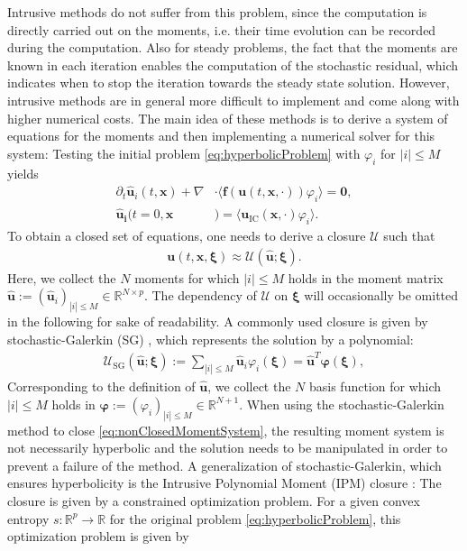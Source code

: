 Intrusive methods do not suffer from this problem, since the computation is directly carried out on the moments, i.e. their time evolution can be recorded during the computation. Also for steady problems, the fact that the moments are known in each iteration enables the computation of the stochastic residual, which indicates when to stop the iteration towards the steady state solution. However, intrusive methods are in general more difficult to implement and come along with higher numerical costs. The main idea of these methods is to derive a system of equations for the moments and then implementing a numerical solver for this system: Testing the initial problem \eqref{eq:hyperbolicProblem} with $\varphi_i$ for $|i|\leq M$ yields
\begin{subequations}\label{eq:nonClosedMomentSystem}
\begin{align}
\partial_t \bm{\hat u}_i(t,\bm{x}) + \nabla&\cdot\langle\bm{f}(\bm{u}(t,\bm{x},\cdot)) \varphi_i\rangle = \bm{0}, \\
\bm{\hat u_i}(t=0,\bm{x}&) = \langle\bm{u}_{\text{IC}}(\bm{x},\cdot)\varphi_i\rangle.
\end{align}
\end{subequations}
To obtain a closed set of equations, one needs to derive a closure $\mathcal{U}$ such that 
\begin{align*}
\bm{u}(t,\bm x,\bm \xi) \approx \mathcal{U}(\bm{\hat u};\bm\xi).
\end{align*}
Here, we collect the $N$ moments for which $\vert i \vert \leq M$ holds in the moment matrix $\bm{\hat{u}}:=(\bm{\hat{u}}_i)_{|i|\leq M}\in\mathbb{R}^{N \times p}$. The dependency of $\mathcal{U}$ on $\bm \xi$ will occasionally be omitted in the following for sake of readability. A commonly used closure is given by stochastic-Galerkin (SG) \cite{ghanem2003stochastic}, which represents the solution by a polynomial:
\begin{align}\label{eq:SGClosure}
\mathcal{U}_{\text{SG}}(\bm{\hat u};\bm\xi):= \sum_{|i|\leq M} \bm{\hat{u}}_i\varphi_i(\bm{\xi}) = \hat{\bm u}^T\bm{\varphi}(\bm\xi),
\end{align}
Corresponding to the definition of $\bm{\hat u}$, we collect the $N$ basis function for which $\vert i \vert \leq M$ holds in $\bm{\varphi}:=(\varphi_i)_{|i|\leq M}\in\mathbb{R}^{N+1}$. When using the stochastic-Galerkin method to close \eqref{eq:nonClosedMomentSystem}, the resulting moment system is not necessarily hyperbolic \cite{poette2009uncertainty} and the solution needs to be manipulated \cite{schlachter2018hyperbolicity} in order to prevent a failure of the method. A generalization of stochastic-Galerkin, which ensures hyperbolicity is the Intrusive Polynomial Moment (IPM) closure \cite{poette2009uncertainty}: The closure is given by a constrained optimization problem. For a given convex entropy $s:\mathbb{R}^p\to\mathbb{R}$ for the original problem \eqref{eq:hyperbolicProblem}, this optimization problem is given by
